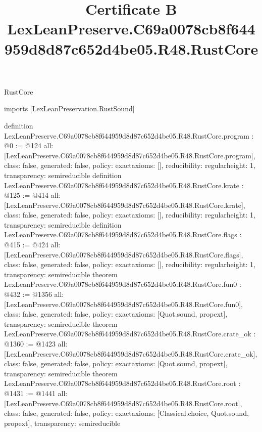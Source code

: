 \begin{lexlean}{RustCore}
\title{Certificate B LexLeanPreserve.C69a0078cb8f644959d8d87c652d4be05.R48.RustCore}
\begin{coremodule}
imports [LexLeanPreservation.RustSound]

definition LexLeanPreserve.C69a0078cb8f644959d8d87c652d4be05.R48.RustCore.program : @0 := @124 {
  all: [LexLeanPreserve.C69a0078cb8f644959d8d87c652d4be05.R48.RustCore.program],
  class: false,
  generated: false,
  policy: exact{axioms: []},
  reducibility: regular{height: 1},
  transparency: semireducible
}
definition LexLeanPreserve.C69a0078cb8f644959d8d87c652d4be05.R48.RustCore.krate : @125 := @414 {
  all: [LexLeanPreserve.C69a0078cb8f644959d8d87c652d4be05.R48.RustCore.krate],
  class: false,
  generated: false,
  policy: exact{axioms: []},
  reducibility: regular{height: 1},
  transparency: semireducible
}
definition LexLeanPreserve.C69a0078cb8f644959d8d87c652d4be05.R48.RustCore.flags : @415 := @424 {
  all: [LexLeanPreserve.C69a0078cb8f644959d8d87c652d4be05.R48.RustCore.flags],
  class: false,
  generated: false,
  policy: exact{axioms: []},
  reducibility: regular{height: 1},
  transparency: semireducible
}
theorem LexLeanPreserve.C69a0078cb8f644959d8d87c652d4be05.R48.RustCore.fun0 : @432 := @1356 {
  all: [LexLeanPreserve.C69a0078cb8f644959d8d87c652d4be05.R48.RustCore.fun0],
  class: false,
  generated: false,
  policy: exact{axioms: [Quot.sound, propext]},
  transparency: semireducible
}
theorem LexLeanPreserve.C69a0078cb8f644959d8d87c652d4be05.R48.RustCore.crate_ok : @1360 := @1423 {
  all: [LexLeanPreserve.C69a0078cb8f644959d8d87c652d4be05.R48.RustCore.crate_ok],
  class: false,
  generated: false,
  policy: exact{axioms: [Quot.sound, propext]},
  transparency: semireducible
}
theorem LexLeanPreserve.C69a0078cb8f644959d8d87c652d4be05.R48.RustCore.root : @1431 := @1441 {
  all: [LexLeanPreserve.C69a0078cb8f644959d8d87c652d4be05.R48.RustCore.root],
  class: false,
  generated: false,
  policy: exact{axioms: [Classical.choice, Quot.sound, propext]},
  transparency: semireducible
}


\end{coremodule}
\end{lexlean}
